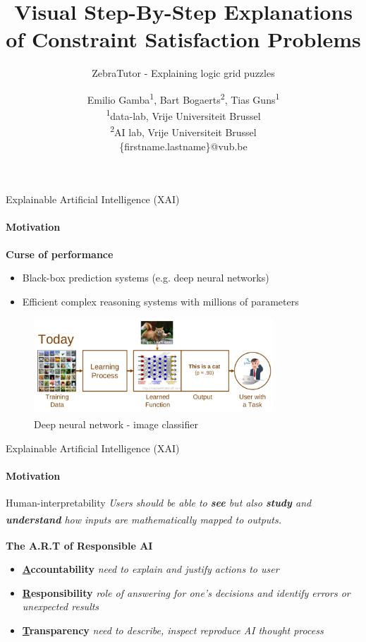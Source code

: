 \documentclass{beamer}
\title{Visual Step-By-Step Explanations of Constraint Satisfaction Problems}
\subtitle{ZebraTutor - Explaining logic grid puzzles}
\author{Emilio Gamba\textsuperscript{1}, Bart Bogaerts\textsuperscript{2}, Tias Guns\textsuperscript{1}\\ 
\tiny{\textsuperscript{1}data-lab, Vrije Universiteit Brussel}\\
\tiny{\textsuperscript{2}AI lab, Vrije Universiteit Brussel}\\
\tiny{\{firstname.lastname\}@vub.be}}
\date{}
\begin{document}
\frame{\maketitle}

\begin{frame}{\small{Explainable Artificial Intelligence (XAI)}}
    \framesubtitle{Motivation}
    \vspace{2cm}
    \textbf{Curse of performance}
    \begin{itemize}
        \item Black-box prediction systems (e.g. deep neural networks)
        \item Efficient complex reasoning systems with millions of parameters
    \end{itemize}

    \begin{figure}[]
        \centering
        \includegraphics[width=0.8\textwidth]{figures/cat}
        {\small \caption{Deep neural network - image classifier \textsuperscript{\cite{gunning2017explainable}}}}
        \label{catdog}
    \end{figure}

\end{frame}

\begin{frame}{\small{Explainable Artificial Intelligence (XAI)}}
    \framesubtitle{Motivation}

    \vspace{2cm}

    \begin{block}{Human-interpretability}
        \emph{Users should be able to \textbf{see} but also \textbf{study} and \textbf{understand} how inputs are mathematically mapped to outputs.} \textsuperscript{\cite{doran2017does}}
    \end{block}
    \vfill
    \textbf{The A.R.T of Responsible AI \textsuperscript{\cite{adadi2018peeking}}}
    \begin{itemize}
        \item \textbf{\underline{A}ccountability} \textit{need to explain and justify actions to user}
        \item \textbf{\underline{R}esponsibility} \textit{role of answering for one's decisions and identify errors or unexpected results}
        \item \textbf{\underline{T}ransparency} \textit{need to describe, inspect reproduce AI thought process}
    \end{itemize}

\end{frame}
\end{document}
